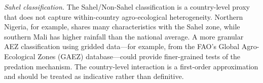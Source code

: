 \textit{Sahel classification.} The Sahel/Non-Sahel classification is a country-level proxy that does not capture within-country agro-ecological heterogeneity. Northern Nigeria, for example, shares many characteristics with the Sahel zone, while southern Mali has higher rainfall than the national average. A more granular AEZ classification using gridded data---for example, from the FAO's Global Agro-Ecological Zones (GAEZ) database---could provide finer-grained tests of the predation mechanism. The country-level interaction is a first-order approximation and should be treated as indicative rather than definitive.
